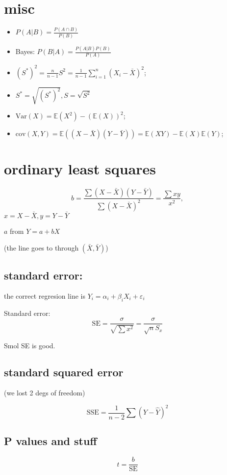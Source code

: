 \documentclass[11pt]{article}
\date{\today}
\title{}
\begin{document}
\section*{misc}
\label{sec:org8d8c067}
\begin{itemize}
\item \(P(A|B) = \frac {P(A \cap B)}{P(B)}\)
\item Bayes: \(P(B|A) = \frac {P(A|B) P(B)}{P(A)}\)
\item \(\displaystyle (S^*)^2 = \frac{n}{n-1} S^2 = \frac{1}{n-1} \sum_{i=1}^{n} (X_i- \bar{X})^2\);
\item \(S^* = \sqrt{(S^*)^2}, S = \sqrt{S^2}\)
\item \(\mathrm{Var}(X) = \mathbb{E}(X^2) - \left(\mathbb{E}(X)\right)^2\);

\item \(\mathrm{cov}(X, Y) = \mathbb{E}\left(( X - \bar{X}  ) (Y - \bar{Y}) \right) = \mathbb{E}(XY) - \mathbb{E}(X)\mathbb{E}(Y)\);
\end{itemize}
\section*{ordinary least squares}
\label{sec:orgb8a25d8}

\[ b  = \frac{\sum(X-\bar{X})(Y-\bar{Y})}{\sum(X-\bar{X})^2} = \frac{\sum xy}{x^2}, \]
\(x =X-\bar{X}, y =Y-\bar{Y}\)

\(a\) from \(Y=a + bX\)

(the line goes to through \((\bar{X}, \bar{Y})\))

\subsection*{standard error:}
\label{sec:org52977cb}
the correct regresion line is \(Y_i = \alpha_i+\beta_i X_i + \varepsilon_i\)

Standard error:
\[ \mathrm{SE} = \frac{\sigma }{\sqrt{\sum x^2}} = \frac{\sigma}{\sqrt{n} S_x} \]

Smol SE is good.

\subsection*{standard squared error}
\label{sec:orgddda237}
(we lost 2 degs of freedom)

\[ \mathrm{SSE} = \frac{1}{n-2} \sum (Y-\hat{Y})^2 \]


\subsection*{P values and stuff}
\label{sec:org6f7c713}
\[ t = \frac{b}{\mathrm{SE}} \]
\end{document}
